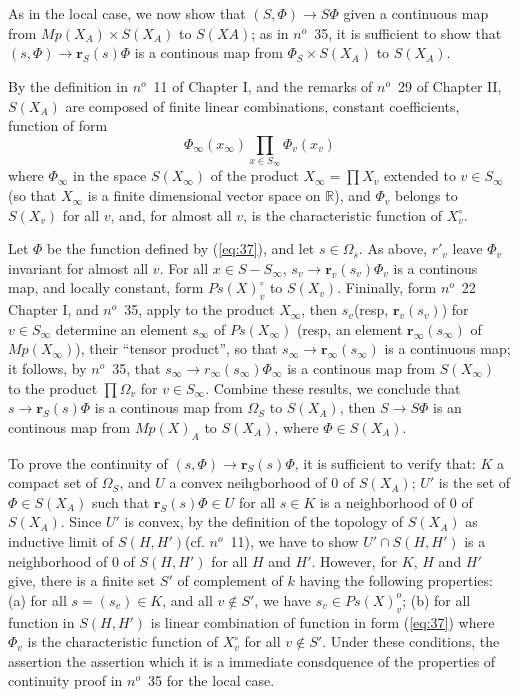\documentclass[12pt]{amsart}
\def\bR{{\mathbb{R}}}
\def\br{{\mathbf{r}}}
\begin{document}
\section{}
As in the local case, we now show that $(S, \Phi)\to S\Phi$ given 
a continuous map from $Mp(X_A)\times S(X_A)$ to $S(XA)$;
as in $n^o$~35, it is sufficient to show that $(s,\Phi) \to \br_S(s) \Phi$ 
is a continous map from $\Phi_S\times S(X_A)$ to $S(X_A)$. 

By the definition in $n^o$~11 of Chapter I, and the remarks of $n^o$~29 of 
Chapter II, $S(X_A)$ are composed of finite linear combinations,
 constant coefficients, function of form
\begin{equation}\label{eq:37}
\Phi_\infty(x_\infty) \prod_{x\in S_\infty}\Phi_v(x_v)
\end{equation} 
where $\Phi_\infty$ in the space $S(X_\infty)$ of the product $X_\infty =\prod X_v$
extended to $v\in S_\infty$ (so that $X_\infty$ is a finite dimensional 
vector space on $\bR$), and  $\Phi_v$ belongs to  $S(X_v)$ for all $v$,
and, for almost all $v$, is the characteristic function of $X_v^\circ$.

Let $\Phi$ be the function defined by (\ref{eq:37}), and let $s\in \Omega_s$. 
As above, $r'_v$ leave $\Phi_v$ invariant for almost all $v$. 
For all $x\in S-S_\infty$, $s_v\to \br_v(s_v)\Phi_v$ is a continous map, 
and locally constant, form $Ps(X)_v^\circ$ to $S(X_v)$. 
Fininally, form $n^o$~22 Chapter I, and $n^o$~35, 
apply to the product $X_\infty$, then $s_v$(resp, $\br_v(s_v)$) 
for $v\in S_\infty$ determine an element $s_\infty$ of $Ps(X_\infty)$
(resp, an element $\br_\infty(s_\infty)$ of $Mp(X_\infty)$),
 their ``tensor product'', so that $s_\infty \to \br_\infty(s_\infty)$ is a 
continuous map; it follows, by $n^o$~35, 
that $s_\infty \to r_\infty(s_\infty)\Phi_\infty$ is a continous map from $S(X_\infty)$
to the product $\prod \Omega_v$ for $v\in S_\infty$. 
Combine these results, we conclude that $s\to \br_S(s)\Phi$ is a continous map 
from $\Omega_S$ to $S(X_A)$, then $S\to S\Phi$ is an continous map from
$Mp(X)_A$ to $S(X_A)$, where $\Phi \in S(X_A)$.

	
To prove the continuity of $(s, \Phi)\to \br_S(s)\Phi$, it is sufficient 
to verify  that: $K$ a compact set of $\Omega_S$, and $U$ 
a convex neihgborhood of $0$ of $S(X_A)$; $U'$ is the set 
of $\Phi\in S(X_A)$ such that $\br_S(s)\Phi\in U$ for all $s\in K$ is a
 neighborhood of $0$ of $S(X_A)$. Since $U'$ is convex, 
by the definition of the topology of $S(X_A)$ as inductive limit of 
$S(H,H')$(cf. $n^o$~11), we have to show $U'\cap S(H,H')$ is a neighborhood of 
$0$ of $S(H,H')$ for all $H$ and $H'$. 
However, for $K$, $H$ and $H'$ give, there is a finite set $S'$ of complement 
of $k$ having the following properties: (a) for all $s=(s_v)\in K$, and all 
$v\notin S'$, we have $s_v\in Ps(X)_v^o$; (b) for all function in $S(H,H')$
is linear combination of function in form (\ref{eq:37}) where $\Phi_v$ 
is the characteristic function of $X_v^\circ$ for all $v\notin S'$. 
Under these conditions, the assertion the assertion which it is a
immediate consdquence of the properties of continuity proof in $n^o$~35 
for the local case.
\end{document}
